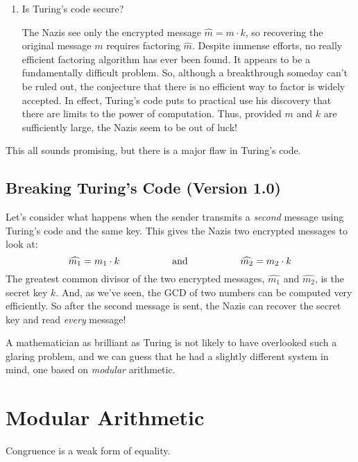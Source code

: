 \begin{enumerate}
\item Is Turing's code secure?

The Nazis see only the encrypted message $\widehat{m} = m \cdot k$, so
recovering the original message $m$ requires factoring $\widehat{m}$.  Despite
immense efforts, no really efficient factoring algorithm has ever been
found.  It appears to be a fundamentally difficult problem.  So,
although a breakthrough someday can't be ruled out, the conjecture
that there is no efficient way to factor is widely accepted.  In
effect, Turing's code puts to practical use his discovery that there
are limits to the power of computation.  Thus, provided $m$ and $k$
are sufficiently large, the Nazis seem to be out of luck!

\end{enumerate}

This all sounds promising, but there is a major flaw in Turing's code.

\subsection{Breaking Turing's Code (Version 1.0)}

Let's consider what happens when the sender transmits a \emph{second}
message using Turing's code and the same key.  This gives the Nazis
two encrypted messages to look at:
\[
\widehat{m_1} = m_1 \cdot k
\hspace{0.75in} \text{and} \hspace{0.75in} \widehat{m_2} = m_2 \cdot k
\]
The greatest common divisor of the two encrypted messages, $\widehat{m_1}$ and
$\widehat{m_2}$, is the secret key $k$.  And, as we've seen, the GCD of two
numbers can be computed very efficiently.  So after the second message
is sent, the Nazis can recover the secret key and read \emph{every}
message!

A mathematician as brilliant as Turing is not likely to have
overlooked such a glaring problem, and we can guess that he had a
slightly different system in mind, one based on \emph{modular}
arithmetic.

\section{Modular Arithmetic}\label{modular_arithmeric_sec}

\begin{editingnotes}
Congruence is a weak form of equality.
\end{editingnotes}

